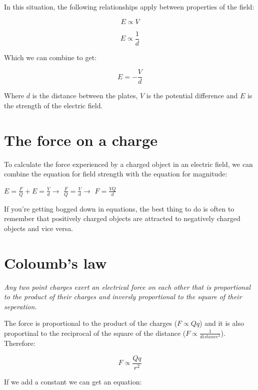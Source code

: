 \documentclass{article}
\begin{document}
In this situation, the following relationships apply between properties of the
field:

\[
	E \propto V
\]

\[
	E \propto \frac{1}{d}
\]

Which we can combine to get: 

\[
	E = -\frac{V}{d}
\]

Where $d$ is the distance between the plates, $V$ is the potential difference
and $E$ is the strength of the electric field.


\section*{The force on a charge}

To calculate the force experienced by a charged object in an electric field, we
can combine the equation for field strength with the equation for magnitude:

\begin{center}
	$E = \frac{F}{Q} + E = \frac{V}{d} \rightarrow $
	$\frac{F}{Q} = \frac{V}{d}	\rightarrow $
	$F = \frac{VQ}{d}$
\end{center}

If you're getting bogged down in equations, the best thing to do is often to
remember that positively charged objects are attracted to negatively charged
objects and vice versa.

\section*{Coloumb's law}


{\it Any two point charges exert an electrical force on each other that is
proportional to the product of their charges and inversly proportional to the
square of their seperation.}

The force is proportional to the product of the charges ($F \propto Qq$) and it
is also proportinal to the reciprocal of the square of the distance ($F \propto
\frac{1}{distance^2}$). Therefore:

\[
	F \propto \frac{Qq}{r^2}
\]

If we add a constant we can get an equation:
\end{document}
